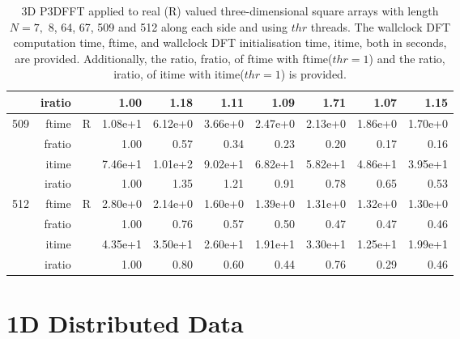 \documentclass[a4paper]{article}
\begin{document}
\begin{table}[htbp]
\begin{center}
\begin{small}
\begin{tabular}{|r|r|r|r|r|r|r|r|r|r|}
     & iratio & &      1.00 &   1.18 &   1.11 &   1.09 &   1.71 &   1.07 &   1.15      \\ \hline 
  509  & ftime & R  &  1.08e+1 &   6.12e+0 &   3.66e+0 &   2.47e+0 &   2.13e+0 &   1.86e+0 &   1.70e+0    \\ 
      & fratio & &     1.00 &   0.57 &   0.34 &   0.23 &   0.20 &   0.17 &   0.16        \\ 
     & itime & &       7.46e+1 &   1.01e+2 &  9.02e+1  &   6.82e+1 &   5.82e+1 &   4.86e+1 &   3.95e+1       \\ 
     & iratio & &      1.00 &   1.35 &   1.21 &   0.91 &   0.78 &   0.65 &   0.53         \\ \hline 
  512  & ftime & R  &  2.80e+0 &   2.14e+0 &   1.60e+0 &   1.39e+0 &   1.31e+0 &   1.32e+0 &   1.30e+0     \\ 
      & fratio & &     1.00 &   0.76 &   0.57 &   0.50 &   0.47 &   0.47 &   0.46     \\ 
     & itime & &       4.35e+1 &   3.50e+1 &   2.60e+1 &   1.91e+1 &   3.30e+1 &   1.25e+1 &   1.99e+1        \\ 
     & iratio & &      1.00 &   0.80 &   0.60 &   0.44 &   0.76 &   0.29 &   0.46        \\ \hline
\end{tabular}
\caption{3D P3DFFT applied to real (R) valued three-dimensional square arrays with length
  $N=7,$ 8, 64, 67, 509 and 512 along each side and using $thr$ threads. The wallclock DFT computation time,
  ftime, and wallclock DFT initialisation time, itime, both in seconds, are provided. Additionally,  the ratio,
  fratio, of ftime  with ftime($thr=1$) and the ratio, iratio, of itime  with itime($thr=1$) is provided. }\label{TblP3DFFT3d}
\end{small}
\end{center}
\end{table}


\clearpage

\section{1D Distributed Data}\label{App:1Ddist}
\end{document}
